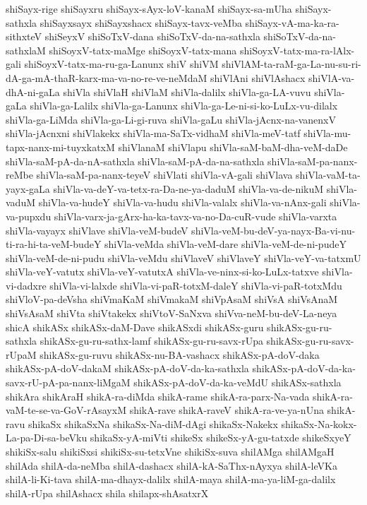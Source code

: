 {shiSayx-rige
shiSayxru
shiSayx-sAyx-loV-kanaM
shiSayx-sa-mUha
shiSayx-sathxla
shiSayxsayx
shiSayxshacx
shiSayx-tavx-veMba
shiSayx-vA-ma-ka-ra-sithxteV
shiSeyxV
shiSoTxV-dana
shiSoTxV-da-na-sathxla
shiSoTxV-da-na-sathxlaM
shiSoyxV-tatx-maMge
shiSoyxV-tatx-mana
shiSoyxV-tatx-ma-ra-lAlx-gali
shiSoyxV-tatx-ma-ru-ga-Lanunx
shiV
shiVM
shiVlAM-ta-raM-ga-La-nu-su-ri-dA-ga-mA-thaR-karx-ma-va-no-re-ve-neMdaM
shiVlAni
shiVlAshacx
shiVlA-va-dhA-ni-gaLa
shiVla
shiVlaH
shiVlaM
shiVla-dalilx
shiVla-ga-LA-vuvu
shiVla-gaLa
shiVla-ga-Lalilx
shiVla-ga-Lanunx
shiVla-ga-Le-ni-si-ko-LuLx-vu-dilalx
shiVla-ga-LiMda
shiVla-ga-Li-gi-ruva
shiVla-gaLu
shiVla-jAcnx-na-vanenxV
shiVla-jAcnxni
shiVlakekx
shiVla-ma-SaTx-vidhaM
shiVla-meV-tatf
shiVla-mu-tapx-nanx-mi-tuyxkatxM
shiVlanaM
shiVlapu
shiVla-saM-baM-dha-veM-daDe
shiVla-saM-pA-da-nA-sathxla
shiVla-saM-pA-da-na-sathxla
shiVla-saM-pa-nanx-reMbe
shiVla-saM-pa-nanx-teyeV
shiVlati
shiVla-vA-gali
shiVlava
shiVla-vaM-ta-yayx-gaLa
shiVla-va-deY-va-tetx-ra-Da-ne-ya-daduM
shiVla-va-de-nikuM
shiVla-vaduM
shiVla-va-hudeY
shiVla-va-hudu
shiVla-valalx
shiVla-va-nAnx-gali
shiVla-va-pupxdu
shiVla-varx-ja-gArx-ha-ka-tavx-va-no-Da-cuR-vude
shiVla-varxta
shiVla-vayayx
shiVlave
shiVla-veM-budeV
shiVla-veM-bu-deV-ya-nayx-Ba-vi-nu-ti-ra-hi-ta-veM-budeY
shiVla-veMda
shiVla-veM-dare
shiVla-veM-de-ni-pudeY
shiVla-veM-de-ni-pudu
shiVla-veMdu
shiVlaveV
shiVlaveY
shiVla-veY-va-tatxmU
shiVla-veY-vatutx
shiVla-veY-vatutxA
shiVla-ve-ninx-si-ko-LuLx-tatxve
shiVla-vi-dadxre
shiVla-vi-lalxde
shiVla-vi-paR-totxM-daleY
shiVla-vi-paR-totxMdu
shiVloV-pa-deVsha
shiVmaKaM
shiVmakaM
shiVpAsaM
shiVsA
shiVsAnaM
shiVsAsaM
shiVta
shiVtakekx
shiVtoV-SaNxva
shiVva-neM-bu-deV-La-neya
shicA
shikASx
shikASx-daM-Dave
shikASxdi
shikASx-guru
shikASx-gu-ru-sathxla
shikASx-gu-ru-sathx-lamf
shikASx-gu-ru-savx-rUpa
shikASx-gu-ru-savx-rUpaM
shikASx-gu-ruvu
shikASx-nu-BA-vashacx
shikASx-pA-doV-daka
shikASx-pA-doV-dakaM
shikASx-pA-doV-da-ka-sathxla
shikASx-pA-doV-da-ka-savx-rU-pA-pa-nanx-liMgaM
shikASx-pA-doV-da-ka-veMdU
shikASx-sathxla
shikAra
shikAraH
shikA-ra-diMda
shikA-rame
shikA-ra-parx-Na-vada
shikA-ra-vaM-te-se-va-GoV-rAsayxM
shikA-rave
shikA-raveV
shikA-ra-ve-ya-nUna
shikA-ravu
shikaSx
shikaSxNa
shikaSx-Na-diM-dAgi
shikaSx-Nakekx
shikaSx-Na-kokx-La-pa-Di-sa-beVku
shikaSx-yA-miVti
shikeSx
shikeSx-yA-gu-tatxde
shikeSxyeY
shikiSx-salu
shikiSxsi
shikiSx-su-tetxVne
shikiSx-suva
shilAMga
shilAMgaH
shilAda
shilA-da-neMba
shilA-dashacx
shilA-kA-SaThx-nAyxya
shilA-leVKa
shilA-li-Ki-tava
shilA-ma-dhayx-dalilx
shilA-maya
shilA-ma-ya-liM-ga-dalilx
shilA-rUpa
shilAshacx
shila
shilapx-shAsatxrX
}
